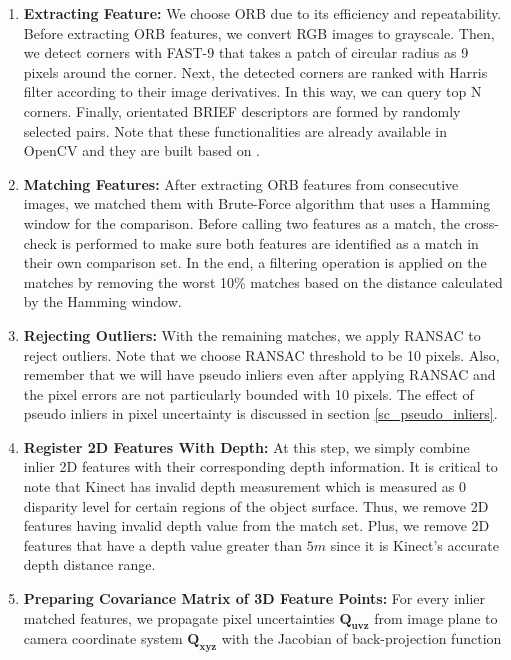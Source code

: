 \documentclass[12pt]{report}
\numberwithin{figure}{section}
\begin{document}
\begin{enumerate} 
  \item \textbf{Extracting Feature:} We choose ORB due to its efficiency and
    repeatability. Before extracting ORB features, we convert RGB images to
    grayscale. Then, we detect corners with FAST-9 that takes a patch of
    circular radius as 9 pixels around the corner. Next, the detected corners
    are ranked with Harris filter according to their image derivatives. In this
    way, we can query top N corners.  Finally, orientated BRIEF descriptors are
    formed by randomly selected pairs.  Note that these functionalities are
    already available in OpenCV and they are built based on 
    \parencite{Rublee2011a}.  
  \item \textbf{Matching Features:} After extracting ORB features from
    consecutive images, we matched them with Brute-Force algorithm that uses
    a Hamming window for the comparison. Before calling two features as a 
    match,
    the cross-check is performed to make sure both features are identified as a
    match in their own comparison set.  In the end, a filtering operation is
    applied on the matches by removing the worst 10\% matches based on the 
    distance
    calculated by the Hamming window.
  \item \textbf{Rejecting Outliers:} With the remaining matches, we apply
    RANSAC to reject outliers. Note that we choose RANSAC threshold to be 10
    pixels. Also, remember that we will have pseudo inliers even after applying
    RANSAC and the pixel errors are not particularly bounded with 10 pixels.
    The effect of pseudo inliers in pixel uncertainty is discussed in section
    \ref{sc_pseudo_inliers}.
  \item \textbf{Register 2D Features With Depth:} At this step, we simply
    combine inlier 2D features with their corresponding depth information. It
    is critical to note that Kinect has invalid depth measurement which is
    measured as 0 disparity level for certain regions of the object surface.
    Thus, we remove 2D features having invalid depth value from the match set.
    Plus, we remove 2D features that have a depth value greater than $5m$ since
    it is Kinect's accurate depth distance range. 
  \item \textbf{Preparing Covariance Matrix of 3D Feature Points:} For every
    inlier matched features, we propagate pixel uncertainties
    $\mathbf{Q_{uvz}}$ from image plane to camera coordinate system
    $\mathbf{Q_{xyz}}$ with the Jacobian of back-projection function

\end{enumerate}
\end{document}
